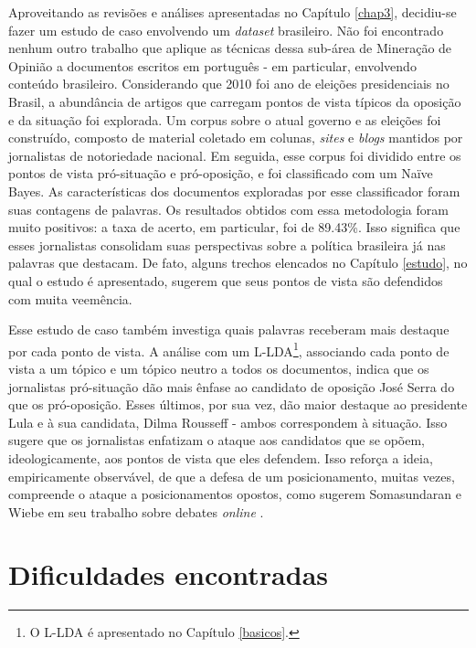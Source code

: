 Aproveitando as revisões e análises apresentadas no Capítulo \ref{chap3}, decidiu-se fazer um estudo de caso envolvendo um \emph{dataset} brasileiro. Não foi encontrado nenhum outro trabalho que aplique as técnicas dessa sub-área de Mineração de Opinião a documentos escritos em português - em particular, envolvendo conteúdo brasileiro. Considerando que 2010 foi ano de eleições presidenciais no Brasil, a abundância de artigos que carregam pontos de vista típicos da oposição e da situação foi explorada. Um corpus sobre o atual governo e as eleições foi construído, composto de material coletado em colunas, \emph{sites} e \emph{blogs} mantidos por jornalistas de notoriedade nacional. Em seguida, esse corpus foi dividido entre os pontos de vista pró-situação e pró-oposição, e foi classificado com um Naïve Bayes. As características dos documentos exploradas por esse classificador foram suas contagens de palavras. Os resultados obtidos com essa metodologia foram muito positivos: a taxa de acerto, em particular, foi de 89.43\%. Isso significa que esses jornalistas consolidam suas perspectivas sobre a política brasileira já nas palavras que destacam. De fato, alguns trechos elencados no Capítulo \ref{estudo}, no qual o estudo é apresentado, sugerem que seus pontos de vista são defendidos com muita veemência. 

Esse estudo de caso também investiga quais palavras receberam mais destaque por cada ponto de vista. A análise com um L-LDA\footnote{O L-LDA é apresentado no Capítulo \ref{basicos}.}, associando cada ponto de vista a um tópico e um tópico neutro a todos os documentos, indica que os jornalistas pró-situação dão mais ênfase ao candidato de oposição José Serra do que os pró-oposição. Esses últimos, por sua vez, dão maior destaque ao presidente Lula e à sua candidata, Dilma Rousseff - ambos correspondem à situação. Isso sugere que os jornalistas enfatizam o ataque aos candidatos que se opõem, ideologicamente, aos pontos de vista que eles defendem. Isso reforça a ideia, empiricamente observável, de que a defesa de um posicionamento, muitas vezes, compreende o ataque a posicionamentos opostos, como sugerem Somasundaran e Wiebe em seu trabalho sobre debates \emph{online} \cite{wiebe}.  

\section{Dificuldades encontradas}

